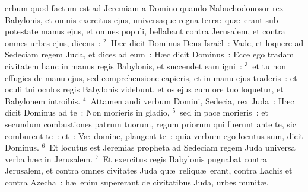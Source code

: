 \bchapter
{}erbum quod factum est ad Jeremiam a Domino quando Nabuchodonosor rex Babylonis, et omnis exercitus ejus, universaque regna terr\ae\ qu\ae\ erant sub potestate manus ejus, et omnes populi, bellabant contra Jerusalem, et contra omnes urbes ejus, dicens~:
${}^{2}$~H\ae c dicit Dominus Deus Isra\"el~: Vade, et loquere ad Sedeciam regem Juda, et dices ad eum~: H\ae c dicit Dominus~: Ecce ego tradam civitatem hanc in manus regis Babylonis, et succendet eam igni~:
${}^{3}$~et tu non effugies de manu ejus, sed comprehensione capieris, et in manu ejus traderis~: et oculi tui oculos regis Babylonis videbunt, et os ejus cum ore tuo loquetur, et Babylonem introibis.
${}^{4}$~Attamen audi verbum Domini, Sedecia, rex Juda~: H\ae c dicit Dominus ad te~: Non morieris in gladio,
${}^{5}$~sed in pace morieris~: et secundum combustiones patrum tuorum, regum priorum qui fuerunt ante te, sic comburent te~: et~: V\ae\ domine, plangent te~: quia verbum ego locutus sum, dicit Dominus.
${}^{6}$~Et locutus est Jeremias propheta ad Sedeciam regem Juda universa verba h\ae c in Jerusalem.
${}^{7}$~Et exercitus regis Babylonis pugnabat contra Jerusalem, et contra omnes civitates Juda qu\ae\ reliqu\ae\ erant, contra Lachis et contra Azecha~: h\ae\ enim supererant de civitatibus Juda, urbes munit\ae .


